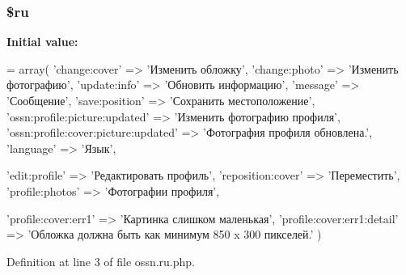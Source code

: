 \subsubsection[{\texorpdfstring{\$ru}{$ru}}]{\setlength{\rightskip}{0pt plus 5cm}\$ru}\hypertarget{components_2_ossn_profile_2locale_2ossn_8ru_8php_aab84a3feda2b0e489cac7cd194e8d726}{}\label{components_2_ossn_profile_2locale_2ossn_8ru_8php_aab84a3feda2b0e489cac7cd194e8d726}
{\bfseries Initial value\+:}
\begin{DoxyCode}
= array(
        \textcolor{stringliteral}{'change:cover'} => \textcolor{stringliteral}{'Изменить обложку'},
        \textcolor{stringliteral}{'change:photo'} => \textcolor{stringliteral}{'Изменить фотографию'},
        \textcolor{stringliteral}{'update:info'} => \textcolor{stringliteral}{'Обновить информацию'},
        \textcolor{stringliteral}{'message'} => \textcolor{stringliteral}{'Сообщение'},
        \textcolor{stringliteral}{'save:position'} => \textcolor{stringliteral}{'Сохранить местоположение'},
        \textcolor{stringliteral}{'ossn:profile:picture:updated'} => \textcolor{stringliteral}{'Изменить фотографию профиля'},
        \textcolor{stringliteral}{'ossn:profile:cover:picture:updated'} => \textcolor{stringliteral}{'Фотография профиля обновлена.'},
        \textcolor{stringliteral}{'language'} => \textcolor{stringliteral}{'Язык'},
        
        \textcolor{stringliteral}{'edit:profile'} => \textcolor{stringliteral}{'Редактировать профиль'},
        \textcolor{stringliteral}{'reposition:cover'} => \textcolor{stringliteral}{'Переместить'},
        \textcolor{stringliteral}{'profile:photos'} => \textcolor{stringliteral}{'Фотографии профиля'},
        
        \textcolor{stringliteral}{'profile:cover:err1'} => \textcolor{stringliteral}{'Картинка слишком маленькая'},
        \textcolor{stringliteral}{'profile:cover:err1:detail'} => \textcolor{stringliteral}{'Обложка должна быть как минимум 850 x 300 пикселей.'}
)
\end{DoxyCode}


Definition at line 3 of file ossn.\+ru.\+php.

